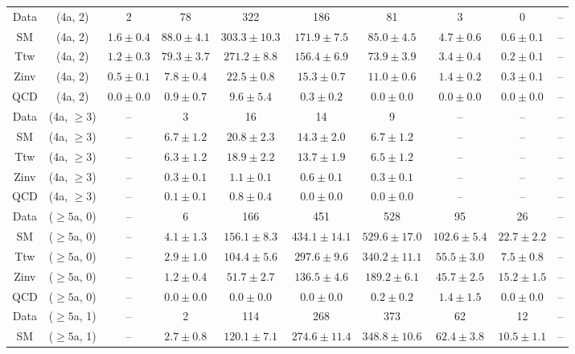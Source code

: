 \begin{table}[h!]
{\begin{tabular}{cccccccccc}
	Data & (4a, 2) & 2 & 78 & 322 & 186 & 81 & 3 & 0 & -- \\[0.5ex] 
	SM & (4a, 2) & $1.6\pm 0.4$ & $88.0\pm 4.1$ & $303.3\pm 10.3$ & $171.9\pm 7.5$ & $85.0\pm 4.5$ & $4.7\pm 0.6$ & $0.6\pm 0.1$ & -- \\[0.5ex] 
	Ttw & (4a, 2) & $1.2\pm 0.3$ & $79.3\pm 3.7$ & $271.2\pm 8.8$ & $156.4\pm 6.9$ & $73.9\pm 3.9$ & $3.4\pm 0.4$ & $0.2\pm 0.1$ & -- \\[0.5ex] 
	Zinv & (4a, 2) & $0.5\pm 0.1$ & $7.8\pm 0.4$ & $22.5\pm 0.8$ & $15.3\pm 0.7$ & $11.0\pm 0.6$ & $1.4\pm 0.2$ & $0.3\pm 0.1$ & -- \\[0.5ex] 
	QCD & (4a, 2) & $0.0\pm 0.0$ & $0.9\pm 0.7$ & $9.6\pm 5.4$ & $0.3\pm 0.2$ & $0.0\pm 0.0$ & $0.0\pm 0.0$ & $0.0\pm 0.0$ & -- \\[0.5ex] 
	Data & (4a, $\ge3$) & -- & 3 & 16 & 14 & 9 & -- & -- & -- \\[0.5ex] 
	SM & (4a, $\ge3$) & -- & $6.7\pm 1.2$ & $20.8\pm 2.3$ & $14.3\pm 2.0$ & $6.7\pm 1.2$ & -- & -- & -- \\[0.5ex] 
	Ttw & (4a, $\ge3$) & -- & $6.3\pm 1.2$ & $18.9\pm 2.2$ & $13.7\pm 1.9$ & $6.5\pm 1.2$ & -- & -- & -- \\[0.5ex] 
	Zinv & (4a, $\ge3$) & -- & $0.3\pm 0.1$ & $1.1\pm 0.1$ & $0.6\pm 0.1$ & $0.3\pm 0.1$ & -- & -- & -- \\[0.5ex] 
	QCD & (4a, $\ge3$) & -- & $0.1\pm 0.1$ & $0.8\pm 0.4$ & $0.0\pm 0.0$ & $0.0\pm 0.0$ & -- & -- & -- \\[0.5ex] 
	Data & ($\ge5$a, 0) & -- & 6 & 166 & 451 & 528 & 95 & 26 & -- \\[0.5ex] 
	SM & ($\ge5$a, 0) & -- & $4.1\pm 1.3$ & $156.1\pm 8.3$ & $434.1\pm 14.1$ & $529.6\pm 17.0$ & $102.6\pm 5.4$ & $22.7\pm 2.2$ & -- \\[0.5ex] 
	Ttw & ($\ge5$a, 0) & -- & $2.9\pm 1.0$ & $104.4\pm 5.6$ & $297.6\pm 9.6$ & $340.2\pm 11.1$ & $55.5\pm 3.0$ & $7.5\pm 0.8$ & -- \\[0.5ex] 
	Zinv & ($\ge5$a, 0) & -- & $1.2\pm 0.4$ & $51.7\pm 2.7$ & $136.5\pm 4.6$ & $189.2\pm 6.1$ & $45.7\pm 2.5$ & $15.2\pm 1.5$ & -- \\[0.5ex] 
	QCD & ($\ge5$a, 0) & -- & $0.0\pm 0.0$ & $0.0\pm 0.0$ & $0.0\pm 0.0$ & $0.2\pm 0.2$ & $1.4\pm 1.5$ & $0.0\pm 0.0$ & -- \\[0.5ex] 
	Data & ($\ge5$a, 1) & -- & 2 & 114 & 268 & 373 & 62 & 12 & -- \\[0.5ex] 
	SM & ($\ge5$a, 1) & -- & $2.7\pm 0.8$ & $120.1\pm 7.1$ & $274.6\pm 11.4$ & $348.8\pm 10.6$ & $62.4\pm 3.8$ & $10.5\pm 1.1$ & -- \\[0.5ex] 

\end{tabular}}
\end{table}
